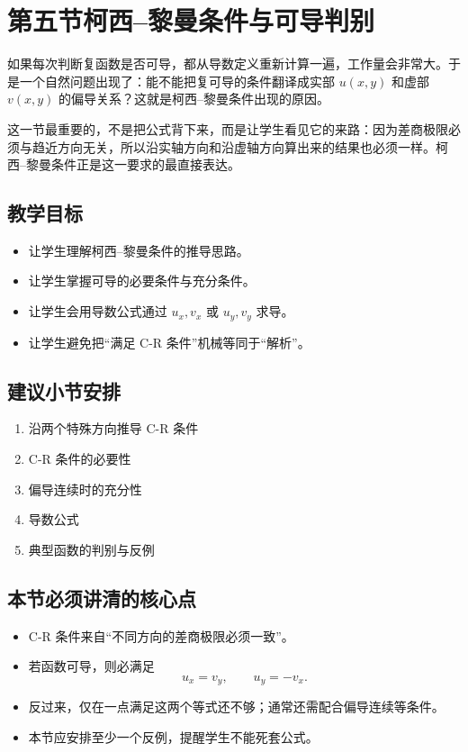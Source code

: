 \section{第五节\quad 柯西--黎曼条件与可导判别}

\begin{wulibj}[本节要解决的问题]
如果每次判断复函数是否可导，都从导数定义重新计算一遍，工作量会非常大。于是一个自然问题出现了：能不能把复可导的条件翻译成实部 $u(x,y)$ 和虚部 $v(x,y)$ 的偏导关系？这就是柯西--黎曼条件出现的原因。

这一节最重要的，不是把公式背下来，而是让学生看见它的来路：因为差商极限必须与趋近方向无关，所以沿实轴方向和沿虚轴方向算出来的结果也必须一样。柯西--黎曼条件正是这一要求的最直接表达。
\end{wulibj}

\subsection*{教学目标}
\begin{itemize}
    \item 让学生理解柯西--黎曼条件的推导思路。
    \item 让学生掌握可导的必要条件与充分条件。
    \item 让学生会用导数公式通过 $u_x,v_x$ 或 $u_y,v_y$ 求导。
    \item 让学生避免把``满足 C-R 条件''机械等同于``解析''。
\end{itemize}

\subsection*{建议小节安排}
\begin{enumerate}
    \item 沿两个特殊方向推导 C-R 条件
    \item C-R 条件的必要性
    \item 偏导连续时的充分性
    \item 导数公式
    \item 典型函数的判别与反例
\end{enumerate}

\subsection*{本节必须讲清的核心点}
\begin{itemize}
    \item C-R 条件来自``不同方向的差商极限必须一致''。
    \item 若函数可导，则必满足
    \[
        u_x=v_y,\qquad u_y=-v_x.
    \]
    \item 反过来，仅在一点满足这两个等式还不够；通常还需配合偏导连续等条件。
    \item 本节应安排至少一个反例，提醒学生不能死套公式。
\end{itemize}


